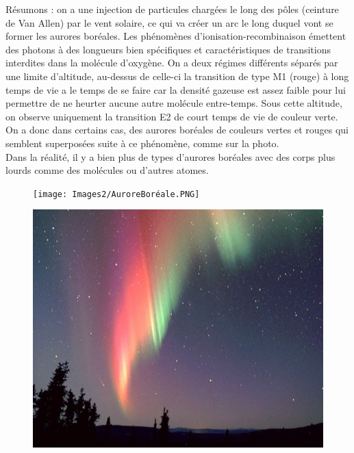 Résumons : on a une injection de particules chargées le long des pôles (ceinture de Van Allen) par le vent solaire, ce qui va créer un arc le long duquel vont se former les aurores boréales. Les phénomènes d'ionisation-recombinaison émettent des photons à des longueurs bien spécifiques et caractéristiques de transitions interdites dans la molécule d'oxygène. On a deux régimes différents séparés par une limite d'altitude, au-dessus de celle-ci la transition de type M1 (rouge) à long temps de vie a le temps de se faire car la densité gazeuse est assez faible pour lui permettre de ne heurter aucune autre molécule entre-temps. Sous cette altitude, on observe uniquement la transition E2 de court temps de vie de couleur verte. On a donc dans certains cas, des aurores boréales de couleurs vertes et rouges qui semblent superposées suite à ce phénomène, comme sur la photo.\\

Dans la réalité, il y a bien plus de types d'aurores boréales avec des corps plus lourds comme des molécules ou d'autres atomes.\\

\begin{figure}[tph]
    \centering
    \texttt{[image: Images2/AuroreBoréale.PNG]}
\end{figure}
\begin{figure}[tph]
    \centering
    \includegraphics[scale=0.6]{Images2/photoAurore.jpg}
\end{figure}